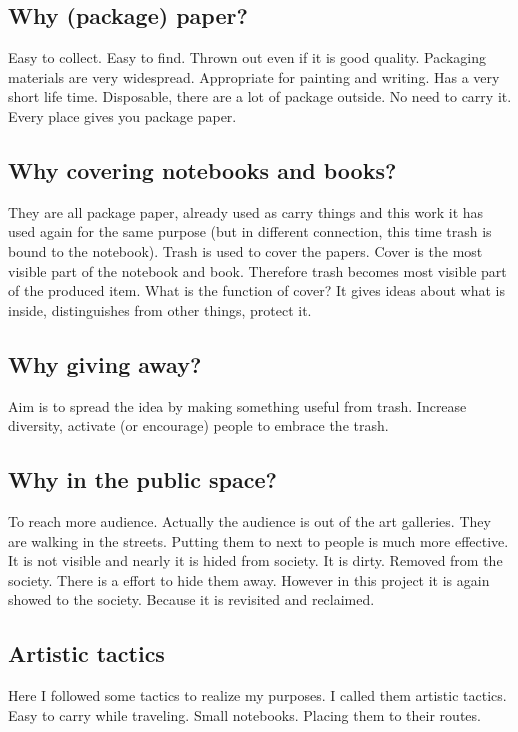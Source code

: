 \subsection{Why (package) paper?}
Easy to collect. Easy to find. Thrown out even if it is good quality. Packaging materials are very widespread. Appropriate for painting and writing. Has a very short life time. Disposable, there are a lot of package outside. No need to carry it. Every place gives you package paper. 

\subsection{Why covering notebooks and books?}
They are all package paper, already used as carry things and this work it has used again for the same purpose (but in different connection, this time trash is bound to the notebook). Trash is used to cover the papers. Cover is the most visible part of the notebook and book. Therefore trash becomes most visible part of the produced item. What is the function of cover? It gives ideas about what is inside, distinguishes from other things, protect it.

\subsection{Why giving away?}
Aim is to spread the idea by making something useful from trash. Increase diversity, activate (or encourage) people to embrace the trash.

\subsection{Why in the public space?}
To reach more audience. Actually the audience is out of the art galleries. They are walking in the streets. Putting them to next to people is much more effective. It is not visible and nearly it is hided from society. It is dirty. Removed from the society. There is a effort to hide them away. However in this project it is again showed to the society. Because it is revisited and reclaimed. 


\subsection{Artistic tactics}
Here I followed some tactics to realize my purposes. I called them artistic tactics. Easy to carry while traveling. Small notebooks. Placing them to their routes. 

